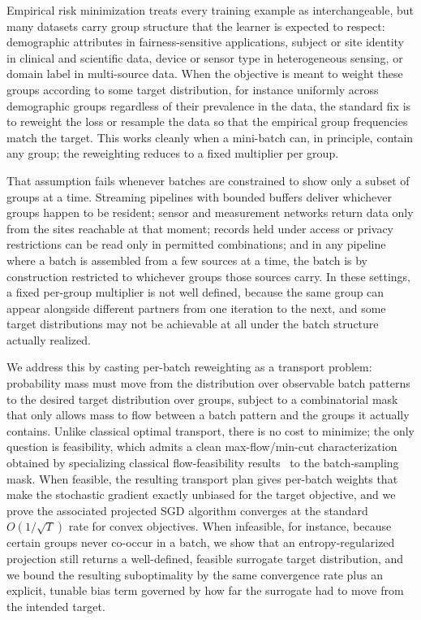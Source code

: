 \documentclass[9pt]{extarticle}
\theoremstyle{definition}
\begin{document}
Empirical risk minimization treats every training example as interchangeable, but many datasets carry group structure that the learner is expected to respect: demographic attributes in fairness-sensitive applications, subject or site identity in clinical and scientific data, device or sensor type in heterogeneous sensing, or domain label in multi-source data. When the objective is meant to weight these groups according to some target distribution, for instance uniformly across demographic groups regardless of their prevalence in the data, the standard fix is to reweight the loss or resample the data so that the empirical group frequencies match the target. This works cleanly when a mini-batch can, in principle, contain any group; the reweighting reduces to a fixed multiplier per group.

That assumption fails whenever batches are constrained to show only a subset of groups at a time. Streaming pipelines with bounded buffers deliver whichever groups happen to be resident; sensor and measurement networks return data only from the sites reachable at that moment; records held under access or privacy restrictions can be read only in permitted combinations; and in any pipeline where a batch is assembled from a few sources at a time, the batch is by construction restricted to whichever groups those sources carry. In these settings, a fixed per-group multiplier is not well defined, because the same group can appear alongside different partners from one iteration to the next, and some target distributions may not be achievable at all under the batch structure actually realized.

We address this by casting per-batch reweighting as a transport problem: probability mass must move from the distribution over observable batch patterns to the desired target distribution over groups, subject to a combinatorial mask that only allows mass to flow between a batch pattern and the groups it actually contains. Unlike classical optimal transport, there is no cost to minimize; the only question is feasibility, which admits a clean max-flow/min-cut characterization obtained by specializing classical flow-feasibility results~\cite{fordfulkerson1962flows,hall1935representatives} to the batch-sampling mask. When feasible, the resulting transport plan gives per-batch weights that make the stochastic gradient exactly unbiased for the target objective, and we prove the associated projected SGD algorithm converges at the standard $O(1/\sqrt{T})$ rate for convex objectives. When infeasible, for instance, because certain groups never co-occur in a batch, we show that an entropy-regularized projection still returns a well-defined, feasible surrogate target distribution, and we bound the resulting suboptimality by the same convergence rate plus an explicit, tunable bias term governed by how far the surrogate had to move from the intended target.
\end{document}
